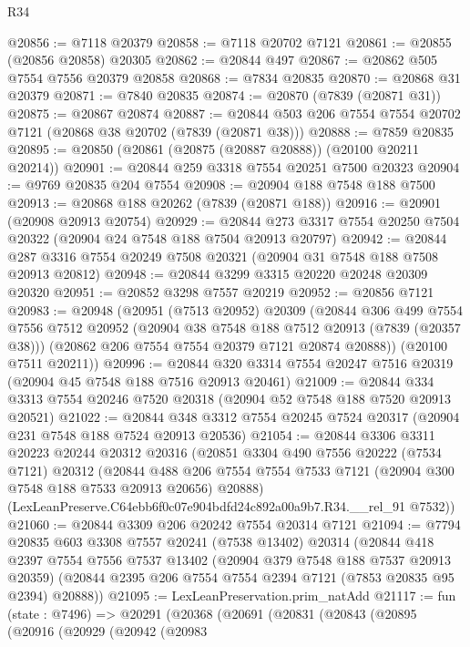 \begin{lexlean}{R34}
\begin{coremodule}
@20856 := @7118 @20379
@20858 := @7118 @20702 @7121
@20861 := @20855 (@20856 @20858) @20305
@20862 := @20844 @497
@20867 := @20862 @505 @7554 @7556 @20379 @20858
@20868 := @7834 @20835
@20870 := @20868 @31 @20379
@20871 := @7840 @20835
@20874 := @20870 (@7839 (@20871 @31))
@20875 := @20867 @20874
@20887 := @20844 @503 @206 @7554 @7554 @20702 @7121 (@20868 @38 @20702 (@7839 (@20871 @38)))
@20888 := @7859 @20835
@20895 := @20850 (@20861 (@20875 (@20887 @20888)) (@20100 @20211 @20214))
@20901 := @20844 @259 @3318 @7554 @20251 @7500 @20323
@20904 := @9769 @20835 @204 @7554
@20908 := @20904 @188 @7548 @188 @7500
@20913 := @20868 @188 @20262 (@7839 (@20871 @188))
@20916 := @20901 (@20908 @20913 @20754)
@20929 := @20844 @273 @3317 @7554 @20250 @7504 @20322 (@20904 @24 @7548 @188 @7504 @20913 @20797)
@20942 := @20844 @287 @3316 @7554 @20249 @7508 @20321 (@20904 @31 @7548 @188 @7508 @20913 @20812)
@20948 := @20844 @3299 @3315 @20220 @20248 @20309 @20320
@20951 := @20852 @3298 @7557 @20219
@20952 := @20856 @7121
@20983 := @20948
    (@20951
      (@7513 @20952)
      @20309
      (@20844
        @306
        @499
        @7554
        @7556
        @7512
        @20952
        (@20904 @38 @7548 @188 @7512 @20913 (@7839 (@20357 @38)))
        (@20862 @206 @7554 @7554 @20379 @7121 @20874 @20888))
      (@20100 @7511 @20211))
@20996 := @20844 @320 @3314 @7554 @20247 @7516 @20319 (@20904 @45 @7548 @188 @7516 @20913 @20461)
@21009 := @20844 @334 @3313 @7554 @20246 @7520 @20318 (@20904 @52 @7548 @188 @7520 @20913 @20521)
@21022 := @20844 @348 @3312 @7554 @20245 @7524 @20317 (@20904 @231 @7548 @188 @7524 @20913 @20536)
@21054 := @20844
    @3306
    @3311
    @20223
    @20244
    @20312
    @20316
    (@20851
      @3304
      @490
      @7556
      @20222
      (@7534 @7121)
      @20312
      (@20844 @488 @206 @7554 @7554 @7533 @7121 (@20904 @300 @7548 @188 @7533 @20913 @20656) @20888)
      (LexLeanPreserve.C64ebb6f0c07e904bdfd24c892a00a9b7.R34.__rel_91 @7532))
@21060 := @20844 @3309 @206 @20242 @7554 @20314 @7121
@21094 := @7794
    @20835
    @603
    @3308
    @7557
    @20241
    (@7538 @13402)
    @20314
    (@20844
      @418
      @2397
      @7554
      @7556
      @7537
      @13402
      (@20904 @379 @7548 @188 @7537 @20913 @20359)
      (@20844 @2395 @206 @7554 @7554 @2394 @7121 (@7853 @20835 @95 @2394) @20888))
@21095 := LexLeanPreservation.prim_natAdd
@21117 := fun (state : @7496) =>
  @20291
    (@20368
      (@20691
        (@20831
          (@20843
            (@20895
              (@20916
                (@20929
                  (@20942
                    (@20983

\end{coremodule}
\end{lexlean}
